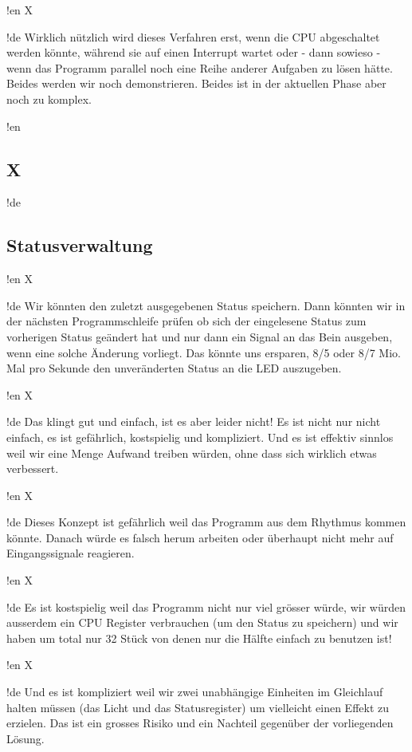 !en X

!de Wirklich nützlich wird dieses Verfahren erst, wenn die CPU abgeschaltet werden könnte, während sie auf einen Interrupt wartet oder - dann sowieso - wenn das Programm parallel noch eine Reihe anderer Aufgaben zu lösen hätte. Beides werden wir noch demonstrieren. Beides ist in der aktuellen Phase aber noch zu komplex.



!en \subsection{X}
!de \subsection{Statusverwaltung}



!en X

!de Wir könnten den zuletzt ausgegebenen Status speichern. Dann könnten wir in der nächsten Programmschleife prüfen ob sich der eingelesene Status zum vorherigen Status geändert hat und nur dann ein Signal an das Bein ausgeben, wenn eine solche Änderung vorliegt. Das könnte uns ersparen, 8/5 oder 8/7 Mio. Mal pro Sekunde den unveränderten Status an die LED auszugeben.



!en X

!de Das klingt gut und einfach, ist es aber leider nicht! Es ist nicht nur nicht einfach, es ist gefährlich, kostspielig und kompliziert. Und es ist effektiv sinnlos weil wir eine Menge Aufwand treiben würden, ohne dass sich wirklich etwas verbessert.



!en X

!de Dieses Konzept ist gefährlich weil das Programm aus dem Rhythmus kommen könnte. Danach würde es falsch herum arbeiten oder überhaupt nicht mehr auf Eingangssignale reagieren.



!en X

!de Es ist kostspielig weil das Programm nicht nur viel grösser würde, wir würden ausserdem ein CPU Register verbrauchen (um den Status zu speichern) und wir haben um \at{} total nur 32 Stück von denen nur die Hälfte einfach zu benutzen ist!



!en X

!de Und es ist kompliziert weil wir zwei unabhängige Einheiten im Gleichlauf halten müssen (das Licht und das Statusregister) um vielleicht einen Effekt zu erzielen. Das ist ein grosses Risiko und ein Nachteil gegenüber der vorliegenden Lösung.



